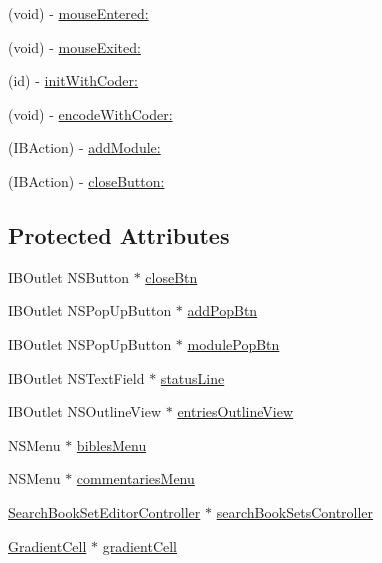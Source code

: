 \begin{DoxyCompactItemize}
\item 
(void) -\/ \hyperlink{interface_bible_view_controller_a13a1d8a374c5a945bfa34dd3058ef6ab}{mouse\-Entered\-:}
\item 
(void) -\/ \hyperlink{interface_bible_view_controller_ac229af7b37d54405d9564790876bb02d}{mouse\-Exited\-:}
\item 
(id) -\/ \hyperlink{interface_bible_view_controller_a6cf57c30ef62d8a0b74eafd74d0f8b39}{init\-With\-Coder\-:}
\item 
(void) -\/ \hyperlink{interface_bible_view_controller_a958c5e82e2f22a1a132161999b5d1704}{encode\-With\-Coder\-:}
\item 
(I\-B\-Action) -\/ \hyperlink{interface_bible_view_controller_a0d52846eaf3ebb411aa1e176cab8e182}{add\-Module\-:}
\item 
(I\-B\-Action) -\/ \hyperlink{interface_bible_view_controller_a787705e739daea408c1396c381a01a74}{close\-Button\-:}
\end{DoxyCompactItemize}
\subsection*{Protected Attributes}
\begin{DoxyCompactItemize}
\item 
I\-B\-Outlet N\-S\-Button $\ast$ \hyperlink{interface_bible_view_controller_aaa46c62506fdd0efab261301e31024d4}{close\-Btn}
\item 
I\-B\-Outlet N\-S\-Pop\-Up\-Button $\ast$ \hyperlink{interface_bible_view_controller_a6c9b35738522910cba1a9437370011e3}{add\-Pop\-Btn}
\item 
I\-B\-Outlet N\-S\-Pop\-Up\-Button $\ast$ \hyperlink{interface_bible_view_controller_ac26a552d00e75a61fd95bac15be69da1}{module\-Pop\-Btn}
\item 
I\-B\-Outlet N\-S\-Text\-Field $\ast$ \hyperlink{interface_bible_view_controller_aacfe6b58ab19b07b9d9c68dcc1f6ddd9}{status\-Line}
\item 
I\-B\-Outlet N\-S\-Outline\-View $\ast$ \hyperlink{interface_bible_view_controller_a073aab4e9ed83ef6dd68e2b6733ca03b}{entries\-Outline\-View}
\item 
N\-S\-Menu $\ast$ \hyperlink{interface_bible_view_controller_a78d2b6870c260f21fff8147d2da7c8bb}{bibles\-Menu}
\item 
N\-S\-Menu $\ast$ \hyperlink{interface_bible_view_controller_a7477801d5bbcbbc3e34290e89f22737c}{commentaries\-Menu}
\item 
\hyperlink{interface_search_book_set_editor_controller}{Search\-Book\-Set\-Editor\-Controller} $\ast$ \hyperlink{interface_bible_view_controller_a873741c182016b0af5e615b9cd403e40}{search\-Book\-Sets\-Controller}
\item 
\hyperlink{interface_gradient_cell}{Gradient\-Cell} $\ast$ \hyperlink{interface_bible_view_controller_a2c1135bb83003bd8e4ab47b9d0f68d3f}{gradient\-Cell}
\end{DoxyCompactItemize}
